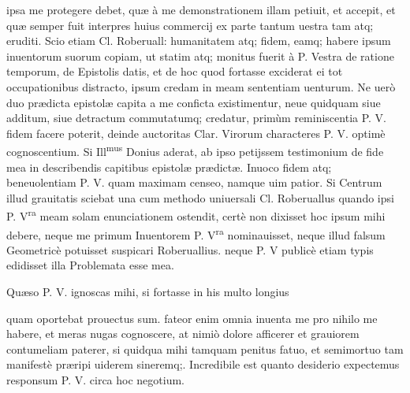 \documentclass[11pt,a4paper]{article}
\begin{document}
ipsa me protegere debet, quæ à me demonstrationem illam petiuit, et accepit, et quæ semper fuit interpres huius commercij ex parte tantum uestra tam  atq; eruditi. Scio etiam  Cl. Roberuall: humanitatem atq; fidem, eamq; habere ipsum inuentorum suorum copiam, ut statim atq; monitus fuerit à P. Vestra de ratione temporum, de Epistolis datis, et de hoc quod fortasse exciderat ei tot occupationibus distracto, ipsum credam in meam sententiam uenturum. Ne uerò duo prædicta epistolæ capita a me conficta existimentur, neue quidquam siue additum, siue detractum commutatumq; credatur, primùm reminiscentia P. V. fidem facere poterit, deinde auctoritas Clar. Virorum characteres P. V. optimè cognoscentium. Si Ill\textsuperscript{mus} Donius aderat, ab ipso petijssem testimonium de fide mea in describendis capitibus epistolæ prædictæ. Inuoco fidem atq; beneuolentiam P. V. quam maximam censeo, namque uim patior. Si Centrum illud grauitatis sciebat una cum methodo uniuersali Cl. Roberuallus quando ipsi P. V\textsuperscript{ra} meam solam enunciationem ostendit, certè non dixisset hoc ipsum mihi debere, neque me primum Inuentorem P. V\textsuperscript{ra} nominauisset, neque illud falsum Geometricè potuisset suspicari Roberuallius. neque P. V publicè etiam typis edidisset illa Problemata esse mea.

Quæso P. V. ignoscas mihi, si fortasse in his multo longius


quam oportebat prouectus sum. fateor enim omnia inuenta me pro nihilo me habere, et meras nugas cognoscere, at nimiò dolore afficerer et grauiorem contumeliam paterer, si quidqua mihi tamquam penitus fatuo, et semimortuo tam manifestè præripi uiderem sineremq;. Incredibile est quanto desiderio expectemus responsum P. V. circa hoc negotium.
\end{document}
